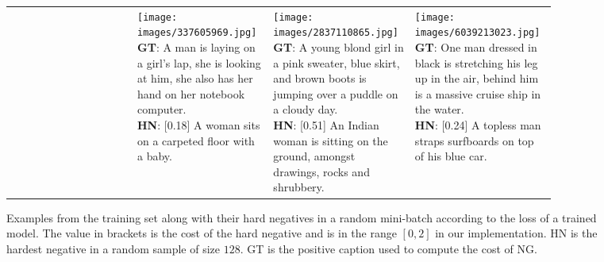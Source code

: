 \begin{figure*}[t!]
\begin{tabular}[h]{>{\centering\arraybackslash}m{0.22\linewidth}
>{\centering\arraybackslash}m{0.22\linewidth}
>{\centering\arraybackslash}m{0.22\linewidth}
>{\centering\arraybackslash}m{0.22\linewidth}}
{{\bf HN}: [0.06] A woman with luggage walks along a street in front of a large advertisement. \\
}
&
\makecell[{{p{\linewidth}}}]{\texttt{[image: images/337605969.jpg]}\\[1mm]
{\bf GT}: A man is laying on a girl's lap, she is looking at him, she also has her hand on her notebook computer. \\[1mm]
{\bf HN}: [0.18] A woman sits on a carpeted floor with a baby. \\[11mm]
}
&
\makecell[{{p{\linewidth}}}]{\texttt{[image: images/2837110865.jpg]}\\[1mm]
{\bf GT}: A young blond girl in a pink sweater, blue skirt, and brown boots is jumping over a puddle on a cloudy day. \\[1mm]
{\bf HN}: [0.51] An Indian woman is sitting on the ground, amongst drawings, rocks and shrubbery. \\[5mm]
}
&
\makecell[{{p{\linewidth}}}]{\texttt{[image: images/6039213023.jpg]}\\[1mm]
{\bf GT}: One man dressed in black is stretching his leg up in the air, behind him is a massive cruise ship in the water. \\[1mm]
{\bf HN}: [0.24] A topless man straps surfboards on top of his blue car. \\[5mm]
}
\\
\end{tabular}
    \vspace{.3cm}
\caption{Examples from the \fthk{} training set along with their hard negatives 
    in a random mini-batch according to the loss of a trained \VSEpp{} model.  
    The value in brackets is the cost of the hard negative and is in the range 
    $[0, 2]$ in our implementation.  HN is the hardest negative in a random 
    sample of size $128$.  GT is the positive caption used to compute the cost 
    of NG.}\label{fig:sample_hard_negatives}
\end{figure*}
 

